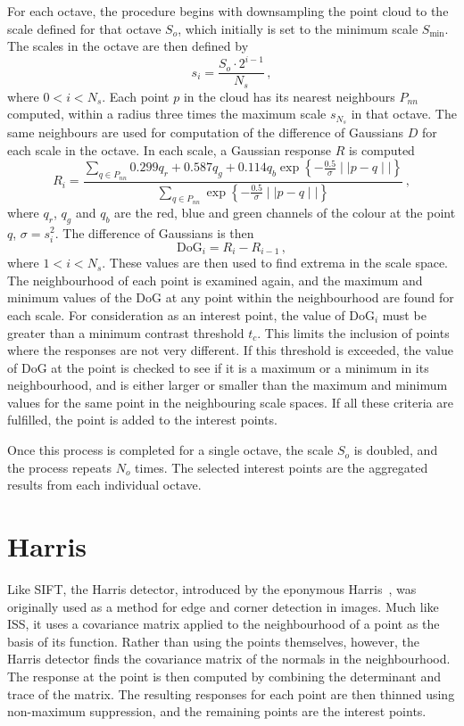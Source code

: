 \documentclass[11pt,a4paper]{kth-mag}
\begin{document}
For each octave, the procedure begins with downsampling the point cloud to the
scale defined for that octave $S_{o}$, which initially is set to the minimum
scale $S_{\min}$. The scales in the octave are then defined by
\begin{equation}
  \label{eq:14}
  s_i=\frac{S_o\cdot 2^{i - 1}}{N_s}\,,
\end{equation}
where $0<i<N_s$. Each point $p$ in the cloud has its nearest neighbours $P_{nn}$ computed,
within a radius three times the maximum scale $s_{N_s}$ in that octave. The same
neighbours are used for computation of the difference of Gaussians $D$ for each
scale in the octave. In each scale, a Gaussian response $R$ is computed
\begin{equation}
  \label{eq:15}
  R_i=\frac{\sum_{q\in P_{nn}}0.299q_r + 0.587q_g +
    0.114q_b\exp\left\{-\frac{0.5}{\sigma}\mid\mid p-q\mid\mid\right\}}{\sum_{q\in P_{nn}}\exp\left\{-\frac{0.5}{\sigma}\mid\mid p-q\mid\mid\right\}}\,,
\end{equation}
where $q_r$, $q_g$ and $q_b$ are the red, blue and green channels of the colour at the
point $q$, $\sigma=s_i^2$. The difference of Gaussians is then
\begin{equation}
  \label{eq:16}
  \text{DoG}_i=R_i-R_{i-1}\,,
\end{equation}
where $1<i<N_s$. These values are then used to find extrema in the scale space.
The neighbourhood of each point is examined again, and the maximum and minimum
values of the DoG at any point within the neighbourhood are found for each
scale. For consideration as an interest point, the value of DoG$_i$ must be
greater than a minimum contrast threshold $t_c$. This limits the inclusion of
points where the responses are not very different. If this threshold is
exceeded, the value of DoG at the point is checked to see if it is a maximum or
a minimum in its neighbourhood, and is either larger or smaller than the maximum
and minimum values for the same point in the neighbouring scale spaces. If all
these criteria are fulfilled, the point is added to the interest points.

Once this process is completed for a single octave, the scale $S_o$ is doubled,
and the process repeats $N_o$ times. The selected interest points are the
aggregated results from each individual octave. 

\section{Harris}
Like SIFT, the Harris detector, introduced by the eponymous
Harris~\cite{harris1988combined}, was originally used as a method for edge and
corner detection in images. Much like ISS, it uses a covariance matrix applied
to the neighbourhood of a point as the basis of its function. Rather than using
the points themselves, however, the Harris detector finds the covariance matrix
of the normals in the neighbourhood. The response at the point is then computed
by combining the determinant and trace of the matrix. The resulting responses
for each point are then thinned using non-maximum suppression, and the remaining
points are the interest points.
\end{document}
